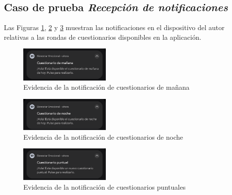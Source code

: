             \clearpage  %
            
        \subsection*{Caso de prueba \textit{Recepción de notificaciones}} 
            Las Figuras \ref{figure:pruebas:notificacion_manana}, \ref{figure:pruebas:notificacion_noche} y \ref{figure:pruebas:notificacion_puntual} muestran las notificaciones en el dispositivo del autor relativas a las rondas de cuestionarios disponibles en la aplicación.
            
            \begin{figure}[h]
                \centering
                \includegraphics[width=0.4\textwidth]{figures/pruebas/notificaciones/Notificacion manana.png}
                \caption{Evidencia de la notificación de cuestionarios de mañana}
                \label{figure:pruebas:notificacion_manana}
            \end{figure}

            \begin{figure}[h]
                \centering
                \includegraphics[width=0.4\textwidth]{figures/pruebas/notificaciones/Notificacion noche.png}
                \caption{Evidencia de la notificación de cuestionarios de noche}
                \label{figure:pruebas:notificacion_noche}
            \end{figure}
            
            \begin{figure}[h]
                \centering
                \includegraphics[width=0.4\textwidth]{figures/pruebas/notificaciones/Notificacion puntual.png}
                \caption{Evidencia de la notificación de cuestionarios puntuales}
                \label{figure:pruebas:notificacion_puntual}
            \end{figure}

